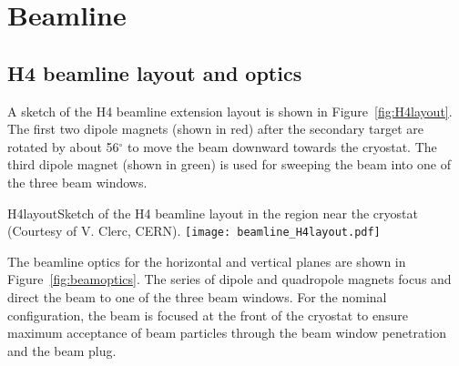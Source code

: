 \section{Beamline}
\label{sec:h4beamline}

\subsection{H4 beamline layout and optics}

A sketch of the H4 beamline extension layout is shown in Figure~\ref{fig:H4layout}. The first two dipole magnets (shown in red) after the secondary target are rotated by about 56$^\circ$ to move the beam downward towards the cryostat. The third dipole magnet (shown in green) is used for sweeping the beam into one of the three beam windows. 

\begin{cdrfigure}{H4layout}{Sketch of the H4 beamline layout in the region near the cryostat (Courtesy of V. Clerc, CERN).}
  \texttt{[image: beamline\_H4layout.pdf]}
\end{cdrfigure}

The beamline optics for the horizontal and vertical planes are shown in Figure~\ref{fig:beamoptics}. The series of dipole and quadropole magnets focus and direct the beam to one of the three beam windows. For the nominal configuration, the beam is focused at the front of the cryostat to ensure maximum acceptance of beam particles through the beam window penetration and the beam plug. 

